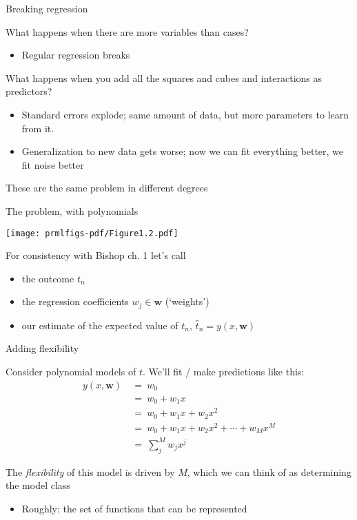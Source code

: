 \documentclass{hertieteaching}
\begin{document}
\begin{frame}{Breaking regression}

What happens when there are more variables than cases?
\begin{itemize}
  \item Regular regression breaks
\end{itemize}
What happens when you add all the squares and cubes and interactions as predictors?
\begin{itemize}
  \item Standard errors explode; same amount of data, but more parameters to learn from it.
  \item Generalization to new data gets worse; now we can fit everything better, we fit noise better
\end{itemize}
These are the same problem in different degrees

\end{frame}

\begin{frame}{The problem, with polynomials}

\medskip
\centerline{\texttt{[image: prmlfigs-pdf/Figure1.2.pdf]}}

For consistency with Bishop ch. 1 let's call
\begin{itemize}
  \item the outcome $t_n$ 
  \item the regression coefficients $w_j \in \textbf{w}$ (`weights')
  \item our estimate of the expected value of $t_n$, $\hat{t}_n = y(x, \textbf{w})$
\end{itemize}


\end{frame}

\begin{frame}{Adding flexibility}

Consider polynomial models of $t$. We'll fit / make predictions like this:
\begin{align*}
y(x, \textbf{w}) & ~=~ w_0\\
                 & ~=~ w_0 + w_1 x \\
                 & ~=~ w_0 + w_1 x + w_2 x^2\\
                 & ~=~ w_0 + w_1 x + w_2 x^2 + \cdots + w_M x^M \\
                 & ~=~ \sum^{M}_j w_j x^j 
\end{align*}

\pause

The \textit{flexibility} of this model is driven by $M$, which we can think of as determining the model class 
\begin{itemize}
  \item Roughly: the set of functions that can be represented
\end{itemize}


\end{frame}
\end{document}
